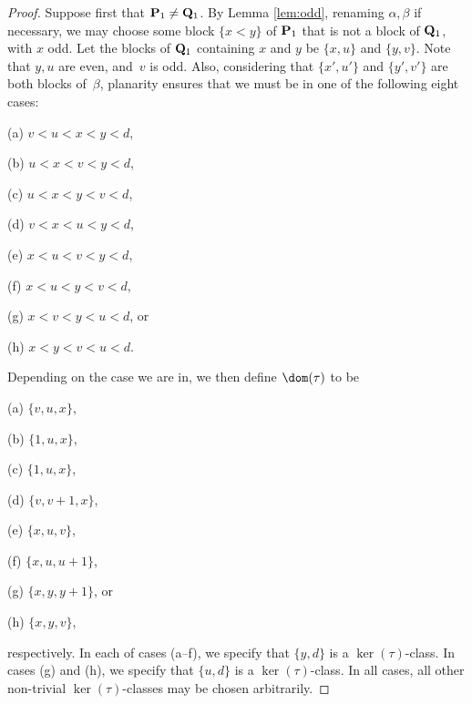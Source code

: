 \begin{proof}
\bigskip{}  Suppose first that ${\bf P}_1\not={\bf Q}_1$.  By Lemma \ref{lem:odd}, renaming $\alpha,\beta$ if necessary, we may choose some block $\{x<y\}$ of ${\bf P}_1$ that is not a block of ${\bf Q}_1$, with $x$ odd.  Let the blocks of ${\bf Q}_1$ containing $x$ and $y$ be $\{x,u\}$ and $\{y,v\}$.  Note that $y,u$ are even, and~$v$ is odd.  
%
Also, considering that $\{x',u'\}$ and $\{y',v'\}$ are both blocks of~$\beta$, planarity ensures that we must be in one of the following eight cases:
\begin{itemize}
\begin{multicols}{4}
\item[(a)] $v<u<x<y<d$,
\item[(b)] $u<x<v<y<d$,
\item[(c)] $u<x<y<v<d$,
\item[(d)] $v<x<u<y<d$,
\item[(e)] $x<u<v<y<d$,
\item[(f)] $x<u<y<v<d$, 
\item[(g)] $x<v<y<u<d$, or
\item[(h)] $x<y<v<u<d$.
\end{multicols}
\end{itemize}
Depending on the case we are in, we then define $\dom(\tau)$ to be
\begin{itemize}
\begin{multicols}{4}
\item[(a)] $\{v,u,x\}$,
\item[(b)] $\{1,u,x\}$,
\item[(c)] $\{1,u,x\}$,
\item[(d)] $\{v,v+1,x\}$, 
\item[(e)] $\{x,u,v\}$,
\item[(f)] $\{x,u,u+1\}$, 
\item[(g)] $\{x,y,y+1\}$, or
\item[(h)] $\{x,y,v\}$,
\end{multicols}
\end{itemize}
respectively.
%
In each of cases (a--f), we specify that $\{y,d\}$ is a $\ker(\tau)$-class.  In cases (g) and (h), we specify that $\{u,d\}$ is a $\ker(\tau)$-class.  In all cases, all other non-trivial $\ker(\tau)$-classes may be chosen arbitrarily.  
%

\end{proof}
